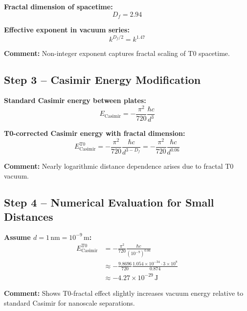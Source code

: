 \documentclass[12pt,a4paper]{article}
\begin{document}
\textbf{Fractal dimension of spacetime:} 
\begin{equation}
	D_f = 2.94
\end{equation}

\textbf{Effective exponent in vacuum series:}
\begin{equation}
	k^{D_f/2} = k^{1.47}
\end{equation}

\textbf{Comment:} Non-integer exponent captures fractal scaling of T0 spacetime.

\subsection{Step 3 – Casimir Energy Modification}

\textbf{Standard Casimir energy between plates:}
\begin{equation}
	E_\text{Casimir} = -\frac{\pi^2}{720} \frac{\hbar c}{d^3}
\end{equation}

\textbf{T0-corrected Casimir energy with fractal dimension:}
\begin{equation}
	E_\text{Casimir}^\text{T0} = -\frac{\pi^2}{720} \frac{\hbar c}{d^{3-D_f}} = -\frac{\pi^2}{720} \frac{\hbar c}{d^{0.06}}
\end{equation}

\textbf{Comment:} Nearly logarithmic distance dependence arises due to fractal T0 vacuum.

\subsection{Step 4 – Numerical Evaluation for Small Distances}

\textbf{Assume $d = 1\,\text{nm} = 10^{-9}\,\text{m}$:}
\begin{align}
	E_\text{Casimir}^\text{T0} &= -\frac{\pi^2}{720} \frac{\hbar c}{(10^{-9})^{0.06}} \\
	&\approx -\frac{9.8696}{720} \frac{1.054\times 10^{-34} \cdot 3\times 10^8}{0.874} \\
	&\approx -4.27 \times 10^{-29} \,\text{J}
\end{align}

\textbf{Comment:} Shows T0-fractal effect slightly increases vacuum energy relative to standard Casimir for nanoscale separations.
\end{document}
